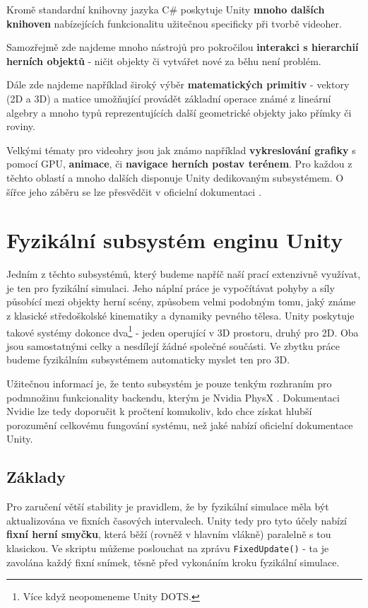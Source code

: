 Kromě standardní knihovny jazyka C\# poskytuje Unity \textbf{mnoho dalších knihoven} nabízejících funkcionalitu užitečnou specificky při tvorbě videoher.

Samozřejmě zde najdeme mnoho nástrojů pro pokročilou \textbf{interakci s hierarchií herních objektů} - ničit objekty či vytvářet nové za běhu není problém. 

Dále zde najdeme například široký výběr \textbf{matematických primitiv} - vektory (2D a 3D) a matice umožňující provádět základní operace známé z lineární algebry a mnoho typů reprezentujících další geometrické objekty jako přímky či roviny.

Velkými tématy pro videohry jsou jak známo například \textbf{vykreslování grafiky} s pomocí GPU, \textbf{animace}, či \textbf{navigace herních postav terénem}. Pro každou z těchto oblastí a mnoho dalších disponuje Unity dedikovaným subsystémem. O šířce jeho záběru se lze přesvědčit v oficielní dokumentaci \cite{Unity}.

\section{Fyzikální subsystém enginu Unity}

Jedním z těchto subsystémů, který budeme napříč naší prací extenzivně využívat, je ten pro fyzikální simulaci. Jeho náplní práce je vypočítávat pohyby a síly působící mezi objekty herní scény, způsobem velmi podobným tomu, jaký známe z klasické středoškolské kinematiky a dynamiky pevného tělesa. Unity poskytuje takové systémy dokonce dva\footnote{Více když neopomeneme Unity DOTS.} - jeden operující v 3D prostoru, druhý pro 2D. Oba jsou samostatnými celky a nesdílejí žádné společné součásti. Ve zbytku práce budeme fyzikálním subsystémem automaticky myslet ten pro 3D.   

Užitečnou informací je, že tento subsystém je pouze tenkým rozhraním pro podmnožinu funkcionality backendu, kterým je Nvidia PhysX \cite{PhysX}. Dokumentaci Nvidie \cite{PhysX} lze tedy doporučit k pročtení komukoliv, kdo chce získat hlubší porozumění celkovému fungování systému, než jaké nabízí oficielní dokumentace Unity.

\subsection{Základy}

Pro zaručení větší stability je pravidlem, že by fyzikální simulace měla být aktualizována ve fixních časových intervalech. Unity tedy pro tyto účely nabízí \textbf{fixní herní smyčku}, která běží (rovněž v hlavním vlákně) paralelně s tou klasickou. Ve skriptu můžeme poslouchat na zprávu \texttt{FixedUpdate()} - ta je zavolána každý fixní snímek, těsně před vykonáním kroku fyzikální simulace. 


